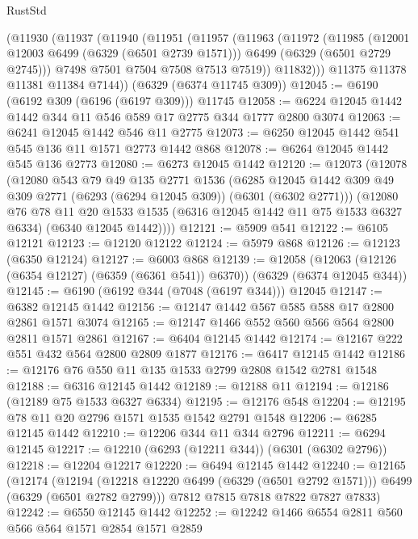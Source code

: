 \begin{lexlean}{RustStd}
\begin{coremodule}
{{    (@11930
      (@11937
        (@11940
          (@11951
            (@11957
              (@11963
                (@11972
                  (@11985
                    (@12001 @12003 @6499 (@6329 (@6501 @2739 @1571)))
                    @6499
                    (@6329 (@6501 @2729 @2745)))
                  @7498
                  @7501
                  @7504
                  @7508
                  @7513
                  @7519))
              @11832)))
        @11375
        @11378
        @11381
        @11384
        @7144))
    (@6329 (@6374 @11745 @309))
@12045 := @6190 (@6192 @309 (@6196 (@6197 @309))) @11745
@12058 := @6224 @12045 @1442 @1442 @344 @11 @546 @589 @17 @2775 @344 @1777 @2800 @3074
@12063 := @6241 @12045 @1442 @546 @11 @2775
@12073 := @6250 @12045 @1442 @541 @545 @136 @11 @1571 @2773 @1442 @868
@12078 := @6264 @12045 @1442 @545 @136 @2773
@12080 := @6273 @12045 @1442
@12120 := @12073
    (@12078
      (@12080
        @543
        @79
        @49
        @135
        @2771
        @1536
        (@6285 @12045 @1442 @309 @49 @309 @2771 (@6293 (@6294 @12045 @309)) (@6301 (@6302 @2771)))
        (@12080
          @76
          @78
          @11
          @20
          @1533
          @1535
          (@6316 @12045 @1442 @11 @75 @1533 @6327 @6334)
          (@6340 @12045 @1442))))
@12121 := @5909 @541
@12122 := @6105 @12121
@12123 := @12120 @12122
@12124 := @5979 @868
@12126 := @12123 (@6350 @12124)
@12127 := @6003 @868
@12139 := @12058
    (@12063 (@12126 (@6354 @12127) (@6359 (@6361 @541)) @6370))
    (@6329 (@6374 @12045 @344))
@12145 := @6190 (@6192 @344 (@7048 (@6197 @344))) @12045
@12147 := @6382 @12145 @1442
@12156 := @12147 @1442 @567 @585 @588 @17 @2800 @2861 @1571 @3074
@12165 := @12147 @1466 @552 @560 @566 @564 @2800 @2811 @1571 @2861
@12167 := @6404 @12145 @1442
@12174 := @12167 @222 @551 @432 @564 @2800 @2809 @1877
@12176 := @6417 @12145 @1442
@12186 := @12176 @76 @550 @11 @135 @1533 @2799 @2808 @1542 @2781 @1548
@12188 := @6316 @12145 @1442
@12189 := @12188 @11
@12194 := @12186 (@12189 @75 @1533 @6327 @6334)
@12195 := @12176 @548
@12204 := @12195 @78 @11 @20 @2796 @1571 @1535 @1542 @2791 @1548
@12206 := @6285 @12145 @1442
@12210 := @12206 @344 @11 @344 @2796
@12211 := @6294 @12145
@12217 := @12210 (@6293 (@12211 @344)) (@6301 (@6302 @2796))
@12218 := @12204 @12217
@12220 := @6494 @12145 @1442
@12240 := @12165
    (@12174
      (@12194 (@12218 @12220 @6499 (@6329 (@6501 @2792 @1571))) @6499 (@6329 (@6501 @2782 @2799)))
      @7812
      @7815
      @7818
      @7822
      @7827
      @7833)
@12242 := @6550 @12145 @1442
@12252 := @12242 @1466 @6554 @2811 @560 @566 @564 @1571 @2854 @1571 @2859
}}
\end{coremodule}
\end{lexlean}
